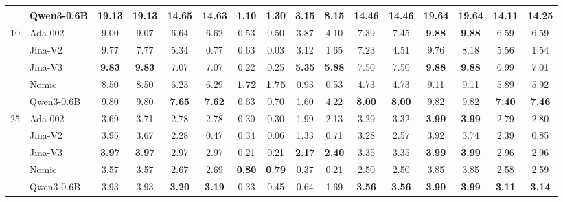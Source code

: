 \begin{sidewaystable}[htbp!]
\begin{tabular}{llcccccccccccccc}
& Qwen3-0.6B & 19.13 & 19.13 & \textbf{14.65} & \textbf{14.63} & 1.10 & 1.30 & 3.15 & 8.15 & \textbf{14.46} & \textbf{14.46} & \textbf{19.64} & \textbf{19.64} & \textbf{14.11} & \textbf{14.25} \\
\midrule
\multirow{5}{*}{10} & Ada-002 & 9.00 & 9.07 & 6.64 & 6.62 & 0.53 & 0.50 & 3.87 & 4.10 & 7.39 & 7.45 & \textbf{9.88} & \textbf{9.88} & 6.59 & 6.59 \\
& Jina-V2 & 9.77 & 7.77 & 5.34 & 0.77 & 0.63 & 0.03 & 3.12 & 1.65 & 7.23 & 4.51 & 9.76 & 8.18 & 5.56 & 1.54 \\
& Jina-V3 & \textbf{9.83} & \textbf{9.83} & 7.07 & 7.07 & 0.22 & 0.25 & \textbf{5.35} & \textbf{5.88} & 7.50 & 7.50 & \textbf{9.88} & \textbf{9.88} & 6.99 & 7.01 \\
& Nomic & 8.50 & 8.50 & 6.23 & 6.29 & \textbf{1.72} & \textbf{1.75} & 0.93 & 0.53 & 4.73 & 4.73 & 9.11 & 9.11 & 5.89 & 5.92 \\
& Qwen3-0.6B & 9.80 & 9.80 & \textbf{7.65} & \textbf{7.62} & 0.63 & 0.70 & 1.60 & 4.22 & \textbf{8.00} & \textbf{8.00} & 9.82 & 9.82 & \textbf{7.40} & \textbf{7.46} \\
\midrule
\multirow{5}{*}{25} & Ada-002 & 3.69 & 3.71 & 2.78 & 2.78 & 0.30 & 0.30 & 1.99 & 2.13 & 3.29 & 3.32 & \textbf{3.99} & \textbf{3.99} & 2.79 & 2.80 \\
& Jina-V2 & 3.95 & 3.67 & 2.28 & 0.47 & 0.34 & 0.06 & 1.33 & 0.71 & 3.28 & 2.57 & 3.92 & 3.74 & 2.39 & 0.85 \\
& Jina-V3 & \textbf{3.97} & \textbf{3.97} & 2.97 & 2.97 & 0.21 & 0.21 & \textbf{2.17} & \textbf{2.40} & 3.35 & 3.35 & \textbf{3.99} & \textbf{3.99} & 2.96 & 2.96 \\
& Nomic & 3.57 & 3.57 & 2.67 & 2.69 & \textbf{0.80} & \textbf{0.79} & 0.37 & 0.21 & 2.50 & 2.50 & 3.85 & 3.85 & 2.58 & 2.59 \\
& Qwen3-0.6B & 3.93 & 3.93 & \textbf{3.20} & \textbf{3.19} & 0.33 & 0.45 & 0.64 & 1.69 & \textbf{3.56} & \textbf{3.56} & \textbf{3.99} & \textbf{3.99} & \textbf{3.11} & \textbf{3.14} \\
\bottomrule
\end{tabular}
\end{sidewaystable}
\clearpage
